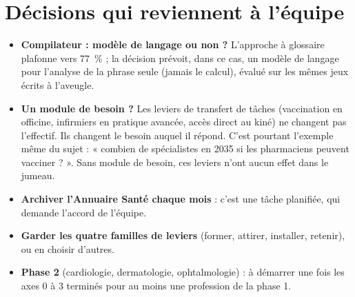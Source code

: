 \section{Décisions qui reviennent à l'équipe}
\begin{itemize}
  \item \textbf{Compilateur : modèle de langage ou non ?} L'approche à glossaire plafonne vers 77~\% ; la décision
        prévoit, dans ce cas, un modèle de langage pour l'analyse de la phrase seule (jamais le calcul), évalué sur
        les mêmes jeux écrits à l'aveugle.
  \item \textbf{Un module de besoin ?} Les leviers de transfert de tâches (vaccination en
        officine, infirmiers en pratique avancée, accès direct au kiné) ne changent pas
        l'effectif. Ils changent le besoin auquel il répond. C'est pourtant l'exemple même du
        sujet : « combien de spécialistes en 2035 si les pharmaciens peuvent vacciner ? ».
        Sans module de besoin, ces leviers n'ont aucun effet dans le jumeau.
  \item \textbf{Archiver l'Annuaire Santé chaque mois} : c'est une tâche planifiée, qui
        demande l'accord de l'équipe.
  \item \textbf{Garder les quatre familles de leviers} (former, attirer, installer, retenir),
        ou en choisir d'autres.
  \item \textbf{Phase 2} (cardiologie, dermatologie, ophtalmologie) : à démarrer une fois les
        axes 0 à 3 terminés pour au moins une profession de la phase 1.
\end{itemize}
